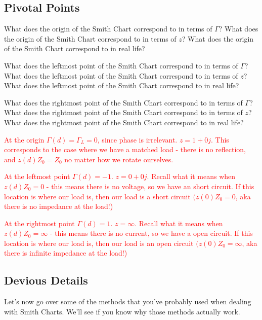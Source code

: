 \documentclass{article}
\begin{document}
\vfill

\subsection{Pivotal Points}

What does the origin of the Smith Chart correspond to in terms of $\Gamma$? What does the origin of the Smith Chart correspond to in terms of $z$? What does the origin of the Smith Chart correspond to in real life?

What does the leftmost point of the Smith Chart correspond to in terms of $\Gamma$? What does the leftmost point of the Smith Chart correspond to in terms of $z$? What does the leftmost point of the Smith Chart correspond to in real life?

What does the rightmost point of the Smith Chart correspond to in terms of $\Gamma$? What does the rightmost point of the Smith Chart correspond to in terms of $z$? What does the rightmost point of the Smith Chart correspond to in real life?

\textcolor{red}{At the origin $\Gamma(d) = \Gamma_L = 0$, since phase is irrelevant. $z = 1 + 0j$. This corresponds to the case where we have a matched load - there is no reflection, and $z(d)Z_0 = Z_0$ no matter how we rotate ourselves.}

\textcolor{red}{At the leftmost point $\Gamma(d) = -1$. $z = 0 + 0j$. Recall what it means when $z(d)Z_0 = 0$ - this means there is no voltage, so we have an short circuit. If this location is where our load is, then our load is a short circuit $(z(0)Z_0 = 0$, aka there is no impedance at the load!)}

\textcolor{red}{At the rightmost point $\Gamma(d) = 1$. $z = \infty$. Recall what it means when $z(d)Z_0 = \infty$ - this means there is no current, so we have a open circuit. If this location is where our load is, then our load is an open circuit $(z(0)Z_0 = \infty$, aka there is infinite impedance at the load!)}

\vfill
\newpage

\subsection{Devious Details}

Let's now go over some of the methods that you've probably used when dealing with Smith Charts. We'll see if you know why those methods actually work.
\end{document}
